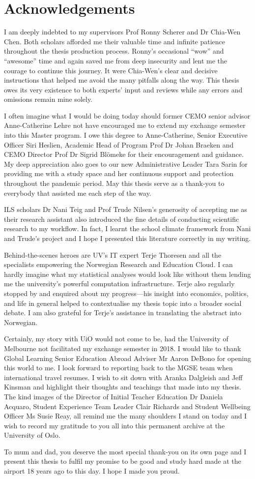 \section*{Acknowledgements}

I am deeply indebted to my supervisors Prof Ronny Scherer and Dr Chia-Wen Chen. Both scholars afforded me their valuable time and infinite patience throughout the thesis production process. Ronny's occasional ``wow'' and ``awesome'' time and again saved me from deep insecurity and lent me the courage to continue this journey. It were Chia-Wen's clear and decisive instructions that helped me avoid the many pitfalls along the way. This thesis owes its very existence to both experts' input and reviews while any errors and omissions remain mine solely.

I often imagine what I would be doing today should former CEMO senior advisor Anne-Catherine Lehre not have encouraged me to extend my exchange semester into this Master program. I owe this degree to Anne-Catherine, Senior Executive Officer Siri Heslien, Academic Head of Program Prof Dr Johan Braeken and CEMO Director Prof Dr Sigrid Bl{\"o}meke for their encouragement and guidance. My deep appreciation also goes to our new Administrative Leader Tara Sarin for providing me with a study space and her continuous support and protection throughout the pandemic period. May this thesis serve as a thank-you to everybody that assisted me each step of the way.

ILS scholars Dr Nani Teig and Prof Trude Nilsen's generosity of accepting me as their research assistant also introduced the fine details of conducting scientific research to my workflow. In fact, I learnt the school climate framework from Nani and Trude's project and I hope I presented this literature correctly in my writing.

Behind-the-scenes heroes are UV's IT expert Terje Thoresen and all the specialists empowering the Norwegian Research and Education Cloud. I can hardly imagine what my statistical analyses would look like without them lending me the university's powerful computation infrastructure. Terje also regularly stopped by and enquired about my progress---his insight into economics, politics, and life in general helped to contextualise my thesis topic into a broader social debate. I am also grateful for Terje's assistance in translating the abstract into Norwegian.

Certainly, my story with UiO would not come to be, had the University of Melbourne not facilitated my exchange semester in 2018. I would like to thank Global Learning Senior Education Abroad Adviser Mr Aaron DeBono for opening this world to me. I look forward to reporting back to the MGSE team when international travel resumes. I wish to sit down with Aranka Dalgleish and Jeff Kinsman and highlight their thoughts and teachings that made into my thesis. The kind images of the Director of Initial Teacher Education Dr Daniela Acquaro, Student Experience Team Leader Clair Richards and Student Wellbeing Officer Ms Susie Reay, all remind me the many shoulders I stand on today and I wish to record my gratitude to you all into this permanent archive at the University of Oslo.

To mum and dad, you deserve the most special thank-you on its own page and I present this thesis to fulfil my promise to be good and study hard made at the airport 18 years ago to this day. I hope I made you proud.
